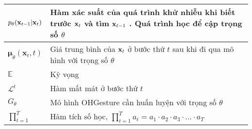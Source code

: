 \begin{center}
\begin{tabular}{|p{3cm}|p{11cm}|}
\hline
$p_{\theta} (\mathbf{x}_{t-1} | \mathbf{x}_{t})$ & Hàm xác suất của quá trình khử nhiễu khi biết trước $\mathbf{x}_{t}$ và tìm $\mathbf{x}_{t-1}$ . Quá trình học để cập trọng số $\theta$   \\
\hline
$\boldsymbol{\mu}_\theta(\mathbf{x}_t, t)$ & Giá trung bình của $\mathbf{x}_t$ ở bước thứ $t$ sau khi đi qua mô hình với trọng số $\theta$  \\
\hline
$\mathbb{E}$ & Kỳ vọng \\
\hline
$\mathcal{L}^t$ & Hàm mất mát ở bước thứ $t$ \\
\hline
$G_\theta$ & Mô hình OHGesture cần huấn luyện với trọng số $\theta$ \\
\hline
$\prod^T_{t=1}$ & Hàm tích số học, $\prod_{t=1}^T a_t = a_1 \cdot a_2 \cdot a_3 \cdot \ldots \cdot a_T$  \\
\hline


\end{tabular}
\end{center}


\pagebreak
